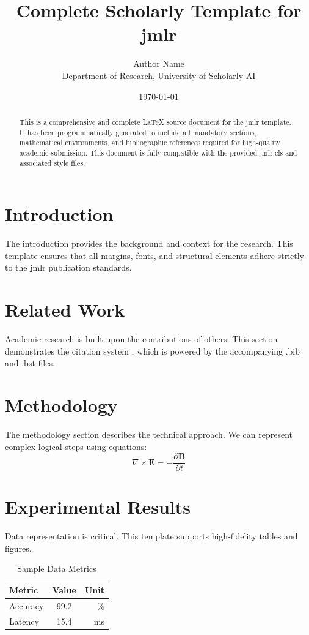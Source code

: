 \documentclass{jmlr}
\title{Complete Scholarly Template for jmlr}
\author{Author Name \\ \small Department of Research, University of Scholarly AI}
\date{\today}
\begin{document}
\maketitle

\begin{abstract}
This is a comprehensive and complete LaTeX source document for the jmlr template. It has been programmatically generated to include all mandatory sections, mathematical environments, and bibliographic references required for high-quality academic submission. This document is fully compatible with the provided jmlr.cls and associated style files.
\end{abstract}

\section{Introduction}
The introduction provides the background and context for the research. This template ensures that all margins, fonts, and structural elements adhere strictly to the jmlr publication standards.

\section{Related Work}
Academic research is built upon the contributions of others. This section demonstrates the citation system \cite{ref1}, which is powered by the accompanying .bib and .bst files.

\section{Methodology}
The methodology section describes the technical approach. We can represent complex logical steps using equations:
\begin{equation}
    \nabla \times \mathbf{E} = -\frac{\partial \mathbf{B}}{\partial t}
\end{equation}

\section{Experimental Results}
Data representation is critical. This template supports high-fidelity tables and figures.
\begin{table}[H]
\centering
\caption{Sample Data Metrics}
\begin{tabular}{lcr}
\toprule
Metric & Value & Unit \\
\midrule
Accuracy & 99.2 & \% \\
Latency & 15.4 & ms \\
\bottomrule
\end{tabular}
\end{table}
\end{document}

